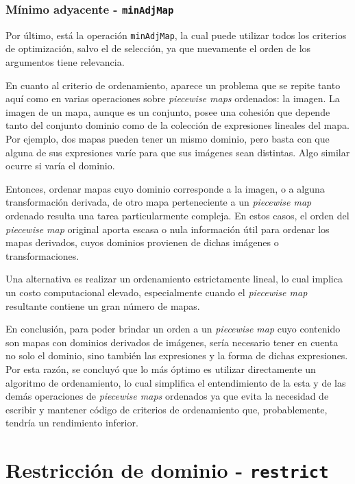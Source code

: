 \subsubsection{Mínimo adyacente - \texttt{minAdjMap}}

Por último, está la operación \texttt{minAdjMap}, la cual puede utilizar todos los criterios de optimización, salvo el de selección, ya que nuevamente el orden de los argumentos tiene relevancia. 

En cuanto al criterio de ordenamiento, aparece un problema que se repite tanto aquí como en varias operaciones sobre \textit{piecewise maps} ordenados: la imagen. La imagen de un mapa, aunque es un conjunto, posee una cohesión que depende tanto del conjunto dominio como de la colección de expresiones lineales del mapa. Por ejemplo, dos mapas pueden tener un mismo dominio, pero basta con que alguna de sus expresiones varíe para que sus imágenes sean distintas. Algo similar ocurre si varía el dominio.

Entonces, ordenar mapas cuyo dominio corresponde a la imagen, o a alguna transformación derivada, de otro mapa perteneciente a un \textit{piecewise map} ordenado resulta una tarea particularmente compleja. En estos casos, el orden del \textit{piecewise map} original aporta escasa o nula información útil para ordenar los mapas derivados, cuyos dominios provienen de dichas imágenes o transformaciones. 

Una alternativa es realizar un ordenamiento estrictamente lineal, lo cual implica un costo computacional elevado, especialmente cuando el \textit{piecewise map} resultante contiene un gran número de mapas.


En conclusión, para poder brindar un orden a un \textit{piecewise map} cuyo contenido son mapas con dominios derivados de imágenes, sería necesario tener en cuenta no solo el dominio, sino también las expresiones y la forma de dichas expresiones. Por esta razón, se concluyó que lo más óptimo es utilizar directamente un algoritmo de ordenamiento, lo cual simplifica el entendimiento de la esta y de las demás operaciones de \textit{piecewise maps} ordenados ya que evita la necesidad de escribir y mantener código de criterios de ordenamiento que, probablemente, tendría un rendimiento inferior.


\section{Restricción de dominio - \texttt{restrict}}

